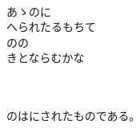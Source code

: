 \documentclass[10pt,b5j]{tarticle} %
\begin{document}
\begin{enumerate}
\begin{minipage}[c]{\blocksize}
        \vspace{\linespace}
        \item~\\
        あゝのに\\
        へられたるもちて\\
        のの\\
        きとならむかな
        
    \end{minipage}
    \begin{minipage}[c]{\blocksize}
        
        \vspace{\linespace}
        \item~\\
        \\
        のはにされたものである。
    
    \end{minipage}
\end{enumerate} %
\end{document}
